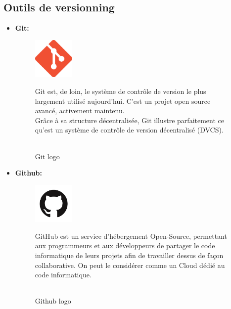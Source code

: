     \subsection{Outils de versionning}
    \begin{itemize}
    
        \item \textbf{Git: }
                \begin{figure}[!htb]\centering
                \begin{minipage}{0.30\textwidth}
                \centering
                    {\includegraphics[width = 2cm , height=2cm]{img/techno/git.png}}
                    \caption{\\ Git logo \cite{git}}\label{Fig:Data1}
                \end{minipage}
                \begin{minipage}{0.60\textwidth}
                    \par Git est, de loin, le système de contrôle de version le plus largement utilisé aujourd'hui. C'est un projet open source avancé, activement maintenu. \\
                     Grâce à sa structure décentralisée, Git illustre parfaitement ce qu'est un système de contrôle de version décentralisé (DVCS)\cite{git}.\\
                    
                \end{minipage}
        \end{figure}
        \item\textbf{Github:}
         \begin{figure}[!htb]\centering
            \begin{minipage}{0.30\textwidth}
            \centering
                {\includegraphics[width = 2cm , height=2cm]{img/techno/github.png}}
                \caption{\\ Github logo \cite{github}}\label{Fig:Data1}
            \end{minipage}
            \begin{minipage}{0.60\textwidth}
                \par GitHub est un service d’hébergement Open-Source, permettant aux programmeurs et aux développeurs de partager le code informatique de leurs projets afin de travailler dessus de façon collaborative. On peut le considérer comme un Cloud dédié au code informatique\cite{github}.
            \end{minipage}
        \end{figure}
        \end{itemize}
